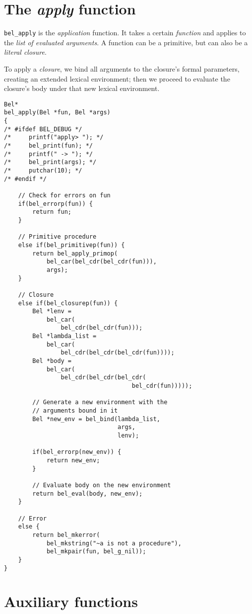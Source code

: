 \documentclass[openright,a4paper,twoside,12pt]{memoir}
\begin{document}
\section{The \emph{apply} function}
\label{sec:org69abcb1}

\texttt{bel\_apply} is the \emph{application} function. It takes a certain \emph{function} and
applies to the \emph{list of evaluated arguments}. A function can be a
primitive, but can also be a \emph{literal closure}.

To apply a \emph{closure}, we bind all arguments to the closure's formal
parameters, creating an extended lexical environment; then we proceed
to evaluate the closure's body under that new lexical environment.

\begin{verbatim}
Bel*
bel_apply(Bel *fun, Bel *args)
{
/* #ifdef BEL_DEBUG */
/*     printf("apply> "); */
/*     bel_print(fun); */
/*     printf(" -> "); */
/*     bel_print(args); */
/*     putchar(10); */
/* #endif */
    
    // Check for errors on fun
    if(bel_errorp(fun)) {
        return fun;
    }
    
    // Primitive procedure
    else if(bel_primitivep(fun)) {
        return bel_apply_primop(
            bel_car(bel_cdr(bel_cdr(fun))),
            args);
    }
    
    // Closure
    else if(bel_closurep(fun)) {
        Bel *lenv =
            bel_car(
                bel_cdr(bel_cdr(fun)));
        Bel *lambda_list =
            bel_car(
                bel_cdr(bel_cdr(bel_cdr(fun))));
        Bel *body =
            bel_car(
                bel_cdr(bel_cdr(bel_cdr(
                                    bel_cdr(fun)))));
        
        // Generate a new environment with the
        // arguments bound in it
        Bel *new_env = bel_bind(lambda_list,
                                args,
                                lenv);

        if(bel_errorp(new_env)) {
            return new_env;
        }

        // Evaluate body on the new environment
        return bel_eval(body, new_env);
    }

    // Error
    else {
        return bel_mkerror(
            bel_mkstring("~a is not a procedure"),
            bel_mkpair(fun, bel_g_nil));
    }
}
\end{verbatim}

\section{Auxiliary functions}
\label{sec:orgf799c95}
\end{document}
